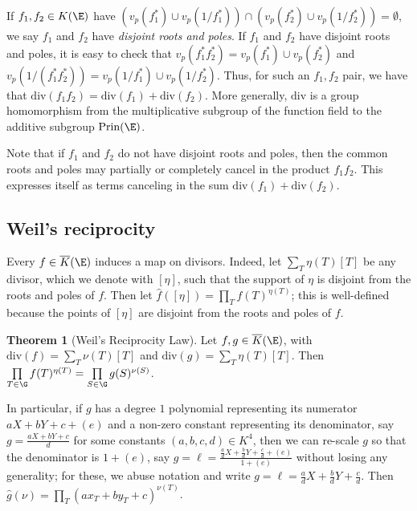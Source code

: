 \documentclass[11pt,letterpaper]{article}
\theoremstyle{definition}
\newtheorem{theorem}{Theorem}
\newcommand{\ff}{K(\E)}
\newcommand{\6}{\mathbf}
\newcommand{\7}{\mathcal}
\begin{document}

If $f_1, f_2 \in \ff$ have $(v_p(f_1^*) \cup v_p(1/f_1^*)) \cap (v_p(f_2^*) \cup v_p(1/f_2^*)) = \emptyset$, we say $f_1$ and $f_2$ have \textit{disjoint roots and poles}. If $f_1$ and $f_2$ have disjoint roots and poles, it is easy to check that $v_p(f_1^*f_2^*) = v_p(f_1^*)\cup v_p(f_2^*)$ and $v_p(1/(f_1^* f_2^*)) = v_p(1/f_1^*)\cup v_p(1/f_2^*)$. Thus, for such an $f_1, f_2$ pair, we have that $\text{div}(f_1f_2) = \text{div}(f_1)+\text{div}(f_2)$. More generally, $\text{div}$ is a group homomorphism from the multiplicative subgroup of the function field to the additive subgroup $\text{Prin}(\E)$.

Note that if $f_1$ and $f_2$ do not have disjoint roots and poles, then the common roots and poles may partially or completely cancel in the product $f_1f_2$. This expresses itself as terms canceling in the sum $\text{div}(f_1) + \text{div}(f_2)$.



\subsection{Weil's reciprocity}

Every $f \in \overline{K}(\E)$ induces a map on divisors. Indeed, let $\sum_T \eta(T)[T]$ be any divisor, which we denote with $[\eta]$, such that the support of $\eta$ is disjoint from the roots and poles of $f$. Then let $\widehat{f}([\eta]) = \prod_T f(T)^{\eta(T)}$; this is well-defined because the points of $[\eta]$ are disjoint from the roots and poles of $f$.

\begin{theorem}[Weil's Reciprocity Law]
Let $f, g \in \overline{K}(\E)$, with $\text{div}(f) = \sum\limits_T \nu(T) [T]$ and $\text{div}(g) = \sum_T \eta(T) [T]$. Then $\prod\limits_{T \in \G} f(T)^{\eta(T)} = \prod\limits_{S \in \G} g(S)^{\nu(S)}$. 
\end{theorem}

In particular, if $g$ has a degree $1$ polynomial representing its numerator $aX + bY + c + (e)$ and a non-zero constant representing its denominator, say $g = \frac{aX+bY+c}{d}$ for some constants $(a, b, c, d) \in K^4$, then we can re-scale $g$ so that the denominator is $1 + (e)$, say  $g = \ell = \frac{\frac{a}{d}X + \frac{b}{d}Y + \frac{c}{d} + (e)}{1 + (e)}$ without losing any generality; for these, we abuse notation and write $g = \ell = \frac{a}{d} X + \frac{b}{d} Y + \frac{c}{d}$. Then $\widehat{g}(\nu) = \prod_T (ax_T + by_T + c)^{\nu(T)}$.
\end{document}
